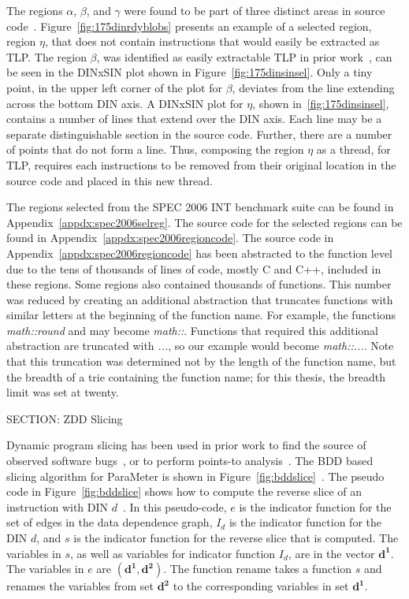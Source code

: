 {The regions $\alpha$, $\beta$, and $\gamma$ were found to be part of three distinct areas in source code~\cite{price:08:pact}. Figure~\ref{fig:175dinrdyblobs} presents an example of a selected region, region $\eta$, that does not contain instructions that would easily be extracted as TLP.  The region $\beta$, was identified as easily extractable TLP in prior work~\cite{price:08:pact}, can be seen in the DINxSIN plot shown in Figure~\ref{fig:175dinsinsel}.  Only a tiny point, in the upper left corner of the plot for $\beta$, deviates from the line extending across the bottom DIN axis.  A DINxSIN plot for $\eta$, shown in~\ref{fig:175dinsinsel}, contains a number of lines that extend over the DIN axis.  Each line may be a separate distinguishable section in the source code.  Further, there are a number of points that do not form a line.  Thus, composing the region $\eta$ as a thread, for TLP, requires each instructions to be removed from their original location in the source code and placed in this new thread.

The regions selected from the SPEC 2006 INT benchmark suite can be found in Appendix~\ref{appdx:spec2006selreg}.  The source code for the selected regions can be found in Appendix~\ref{appdx:spec2006regioncode}.  The source code in Appendix~\ref{appdx:spec2006regioncode} has been abstracted to the function level due to the tens of thousands of lines of code, mostly C and C++, included in these regions.  Some regions also contained thousands of functions.  This number was reduced by creating an additional abstraction that truncates functions with similar letters at the beginning of the function name.  For example, the functions \textit{math::round} and  may become \textit{math::}. Functions that required this additional abstraction are truncated with \textit{...}, so our example would become \textit{math::...}. Note that this truncation was determined not by the length of the function name, but the breadth of a trie containing the function name; for this thesis, the breadth limit was set at twenty.

SECTION: ZDD Slicing


Dynamic program slicing has been used in prior work to find the source of observed software bugs~\cite{gallager:91:se,agrawal:90:pldi,agrawal:92:thesis}, or to perform points-to analysis~\cite{lhotak:08:lcpc}. The BDD based slicing algorithm for ParaMeter is shown in Figure~\ref{fig:bddslice}~\cite{price:06:cal}. The pseudo code in Figure~\ref{fig:bddslice} shows how to compute the reverse slice of an instruction with DIN $d$~\cite{price:06:cal}. In this pseudo-code, $e$ is the indicator function for the set of edges in the data dependence graph, $I_d$ is the indicator function for the DIN $d$, and $s$ is the indicator function for the reverse slice that is computed.  The variables in $s$, as well as variables for indicator function $I_d$, are in the vector $\mathbf{d^1}$. The variables in $e$ are $(\mathbf{d^1},\mathbf{d^2})$.  The function $\mathrm{rename}$ takes a function $s$ and renames the variables from set $\mathbf{d^2}$ to the corresponding variables in set $\mathbf{d^1}$.

}
